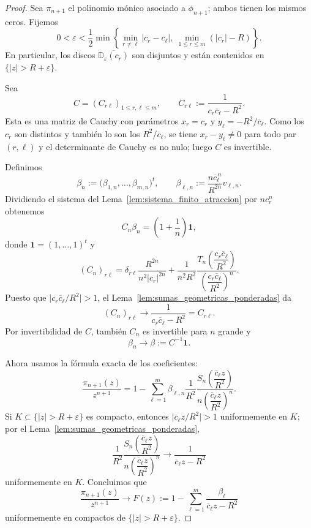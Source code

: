 \begin{proof}
	Sea $\pi_{n+1}$ el polinomio mónico asociado a $\phi_{n+1}$; ambos tienen los mismos ceros. Fijemos
	\[
		0<\varepsilon<\frac12\min\left\{\min_{r\ne \ell}|c_r-c_\ell|,\ \min_{1\le r\le m}(|c_r|-R)\right\}.
	\]
	En particular, los discos $\overline{\mathbb D_\varepsilon(c_r)}$ son disjuntos y están contenidos en $\{|z|>R+\varepsilon\}$.

	Sea
	\[
		C=(C_{r\ell})_{1\le r,\ell\le m},
		\qquad
		C_{r\ell}:=\frac{1}{c_r\overline c_\ell-R^2}.
	\]
	Esta es una matriz de Cauchy con parámetros $x_r=c_r$ y $y_\ell=-R^2/\overline c_\ell$. Como los $c_r$ son distintos y también lo son los $R^2/\overline c_\ell$, se tiene $x_r-y_\ell\neq0$ para todo par $(r,\ell)$ y el determinante de Cauchy es no nulo; luego $C$ es invertible.

	Definimos
	\[
		\beta_n:=\bigl(\beta_{1,n},\dots,\beta_{m,n}\bigr)^t,
		\qquad
		\beta_{\ell,n}:=\frac{n\overline c_\ell^{\,n}}{R^{2n}}v_{\ell,n}.
	\]
	Dividiendo el sistema del Lema~\ref{lem:sistema_finito_atraccion} por $nc_r^n$ obtenemos
	\[
		C_n\beta_n=\left(1+\frac1n\right)\mathbf 1,
	\]
	donde $\mathbf 1=(1,\dots,1)^t$ y
	\[
		(C_n)_{r\ell}
		=
		\delta_{r\ell}\frac{R^{2n}}{n^2|c_r|^{2n}}
		+
		\frac{1}{n^2R^2}
		\frac{T_n\!\left(\dfrac{c_r\overline c_\ell}{R^2}\right)}{\left(\dfrac{c_r\overline c_\ell}{R^2}\right)^n}.
	\]
	Puesto que $\bigl|c_r\overline c_\ell/R^2\bigr|>1$, el Lema~\ref{lem:sumas_geometricas_ponderadas} da
	\[
		(C_n)_{r\ell}\longrightarrow \frac{1}{c_r\overline c_\ell-R^2}=C_{r\ell}.
	\]
	Por invertibilidad de $C$, también $C_n$ es invertible para $n$ grande y
	\[
		\beta_n\longrightarrow \beta:=C^{-1}\mathbf 1.
	\]

	Ahora usamos la fórmula exacta de los coeficientes:
	\[
		\frac{\pi_{n+1}(z)}{z^{n+1}}
		=
		1-
		\sum_{\ell=1}^m
		\beta_{\ell,n}
		\frac{1}{R^2}
		\frac{S_n\!\left(\dfrac{\overline c_\ell z}{R^2}\right)}{n\left(\dfrac{\overline c_\ell z}{R^2}\right)^n}.
	\]
	Si $K\subset\{|z|>R+\varepsilon\}$ es compacto, entonces $\bigl|\overline c_\ell z/R^2\bigr|>1$ uniformemente en $K$; por el Lema~\ref{lem:sumas_geometricas_ponderadas},
	\[
		\frac{1}{R^2}
		\frac{S_n\!\left(\dfrac{\overline c_\ell z}{R^2}\right)}{n\left(\dfrac{\overline c_\ell z}{R^2}\right)^n}
		\longrightarrow
		\frac{1}{\overline c_\ell z-R^2}
	\]
	uniformemente en $K$. Concluimos que
	\[
		\frac{\pi_{n+1}(z)}{z^{n+1}}
		\longrightarrow
		F(z):=1-\sum_{\ell=1}^m\frac{\beta_\ell}{\overline c_\ell z-R^2}
	\]
	uniformemente en compactos de $\{|z|>R+\varepsilon\}$.


\end{proof}
